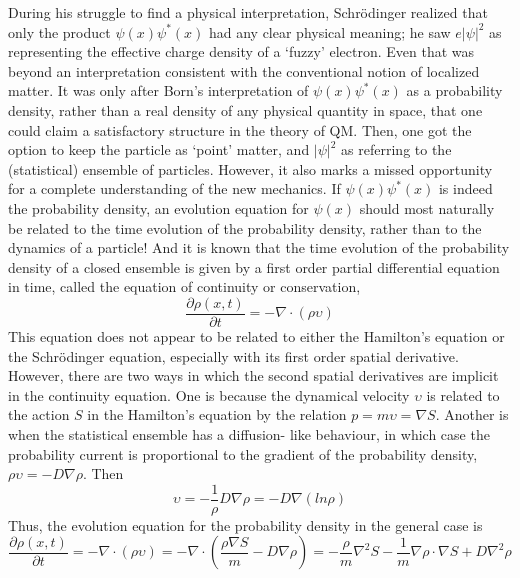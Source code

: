 During his struggle to find a physical interpretation, Schr\"{o}dinger realized that only the
product $\psi(x) \psi^{\ast}(x)$ had any clear physical meaning; he saw $e|\psi|^2$ as representing the effective
charge density of a `fuzzy' electron. Even that was beyond an interpretation consistent
with the conventional notion of localized matter. It was only after Born's interpretation of
$\psi(x)\psi^{\ast} (x)$ as a probability density, rather than a real density of any physical quantity in
space, that one could claim a satisfactory structure in the theory of QM. Then, one got the
option to keep the particle as `point' matter, and $|\psi|^2$ as referring to the (statistical) ensemble
of particles. However, it also marks a missed opportunity for a complete understanding of
the new mechanics. If $\psi(x) \psi^{\ast} (x)$ is indeed the probability density, an evolution equation
for $\psi(x)$ should most naturally be related to the time evolution of the probability density,
rather than to the dynamics of a particle! And it is known that the time evolution of the
probability density of a closed ensemble is given by a first order partial differential equation
in time, called the equation of continuity or conservation,
\begin{equation*}
\frac{\partial \rho (x,t)}{\partial t} = - \nabla \cdot (\rho \upsilon) \tag{8}\label{c14-eq8}
\end{equation*}
This equation does not appear to be related to either the Hamilton's equation or the
Schr\"{o}dinger equation, especially with its first order spatial derivative. However, there are
two ways in which the second spatial derivatives are implicit in the continuity equation. One
is because the dynamical velocity $\upsilon$ is related to the action $S$ in the Hamilton's equation
by the relation $p = m \upsilon =\nabla S$. Another is when the statistical ensemble has a diffusion-
like behaviour, in which case the probability current is proportional to the gradient of the
probability density, $\rho \upsilon = - D \nabla \rho$. Then
\begin{equation*}
\upsilon = - \frac{1}{\rho} D \nabla \rho  = - D \nabla (l n \rho) \tag{9}\label{c14-eq9}
\end{equation*}
Thus, the evolution equation for the probability density in the general case is
{\fontsize{9}{9}\selectfont\begin{equation*}
\frac{\partial \rho (x,t)}{\partial t} = - \nabla \cdot (\rho \upsilon) = - \nabla \cdot \left(\frac{\rho \nabla S}{m} - D \nabla \rho \right) = - \frac{\rho}{m} \nabla^2 S - \frac{1}{m} \nabla \rho \cdot \nabla S + D \nabla^2 \rho \tag{10}\label{c14-eq10} 
\end{equation*}}
